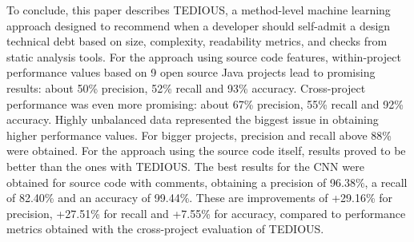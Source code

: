 

To conclude, this paper describes \ac{TEDIOUS}, a method-level machine learning approach designed to recommend when a developer should self-admit a design technical debt based on size, complexity, readability metrics, and checks from static analysis tools. For the approach using source code features, within-project performance values based on 9 open source Java projects lead to promising results: about 50\% precision, 52\% recall and 93\% accuracy. Cross-project performance was even more promising: about 67\% precision, 55\% recall and 92\% accuracy. Highly unbalanced data represented the biggest issue in obtaining higher performance values. For bigger projects, precision and recall above 88\% were obtained. For the approach using the source code itself, results proved to be better than the ones with TEDIOUS. The best results for the CNN were obtained for source code with comments, obtaining a precision of 96.38\%, a recall of 82.40\% and an accuracy of 99.44\%. These are improvements of +29.16\% for precision, +27.51\% for recall and +7.55\% for accuracy, compared to performance metrics obtained with the cross-project evaluation of TEDIOUS.


